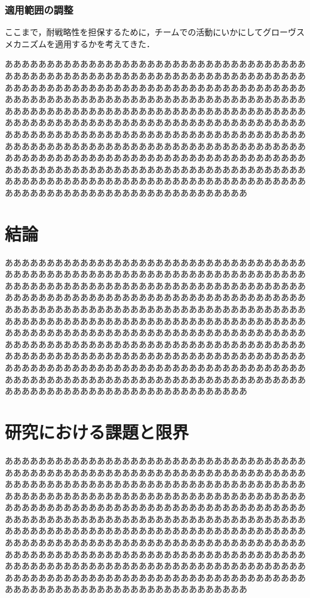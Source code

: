 \documentclass[a4paper, 11pt]{jsarticle}
\begin{document}
\subsubsection{適用範囲の調整}
ここまで，耐戦略性を担保するために，チームでの活動にいかにしてグローヴスメカニズムを適用するかを考えてきた．

あああああああああああああああああああああああああああああああああああああああああああああああああああああああああああああああああああああああああああああああああああああああああああああああああああああああああああああああああああああああああああああああああああああああああああああああああああああああああああああああああああああああああああああああああああああああああああああああああああああああああああああああああああああああああああああああああああああああああああああああああああああああああああああああああああああああああああああああああああああああああああああああああああああああああああああああああああああああああああああああああああああああああああああああああああああああああああああああああああああああああああああああああああああああああああああああああああああああああああああああああああああああああああああああああああああああああ
\section{結論}
あああああああああああああああああああああああああああああああああああああああああああああああああああああああああああああああああああああああああああああああああああああああああああああああああああああああああああああああああああああああああああああああああああああああああああああああああああああああああああああああああああああああああああああああああああああああああああああああああああああああああああああああああああああああああああああああああああああああああああああああああああああああああああああああああああああああああああああああああああああああああああああああああああああああああああああああああああああああああああああああああああああああああああああああああああああああああああああああああああああああああああああああああああああああああああああああああああああああああああああああああああああああああああああああああああああああああ
\section{研究における課題と限界}
あああああああああああああああああああああああああああああああああああああああああああああああああああああああああああああああああああああああああああああああああああああああああああああああああああああああああああああああああああああああああああああああああああああああああああああああああああああああああああああああああああああああああああああああああああああああああああああああああああああああああああああああああああああああああああああああああああああああああああああああああああああああああああああああああああああああああああああああああああああああああああああああああああああああああああああああああああああああああああああああああああああああああああああああああああああああああああああああああああああああああああああああああああああああああああああああああああああああああああああああああああああああああああああああああああああああああ
\end{document}
